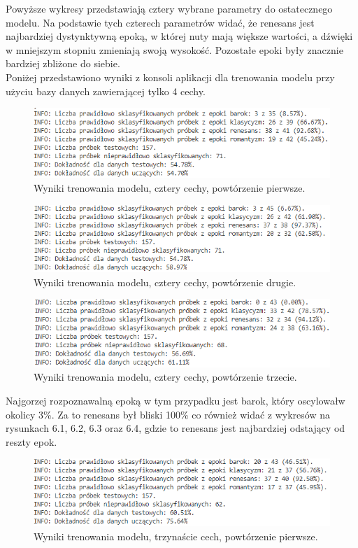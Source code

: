 \documentclass[printmode, eng]{mgr}
\newcommand\tab[1][1cm]{\hspace*{#1}}
\begin{document}
\tab Powyższe wykresy przedstawiają cztery wybrane parametry do ostatecznego modelu. Na podstawie tych czterech parametrów widać, że renesans jest najbardziej dystynktywną epoką, w której nuty mają większe wartości, a dźwięki w mniejszym stopniu zmieniają swoją wysokość. Pozostałe epoki były znacznie bardziej zbliżone do siebie.\\
\tab Poniżej przedstawiono wyniki z konsoli aplikacji dla trenowania modelu przy użyciu bazy danych zawierającej tylko 4 cechy.
\begin{figure}[H]
\centering
\includegraphics[scale=0.9]{wyniki_smaller_0.png}
\caption{Wyniki trenowania modelu, cztery cechy, powtórzenie pierwsze.}
\end{figure}
\begin{figure}[H]
\centering
\includegraphics[scale=0.9]{wyniki_smaller_1.png}
\caption{Wyniki trenowania modelu, cztery cechy, powtórzenie drugie.}
\end{figure}
\begin{figure}[H]
\centering
\includegraphics[scale=0.9]{wyniki_smaller_2.png}
\caption{Wyniki trenowania modelu, cztery cechy, powtórzenie trzecie.}
\end{figure}
\tab Najgorzej rozpoznawalną epoką w tym przypadku jest barok, który oscylował\linebreak w okolicy 3\%. Za to renesans był bliski 100\% co również widać z wykresów na rysunkach 6.1, 6.2, 6.3 oraz 6.4, gdzie to renesans jest najbardziej odstający od reszty epok.
\begin{figure}[H]
\centering
\includegraphics[scale=0.9]{wyniki_small_0.png}
\caption{Wyniki trenowania modelu, trzynaście cech, powtórzenie pierwsze.}
\end{figure}
\end{document}
